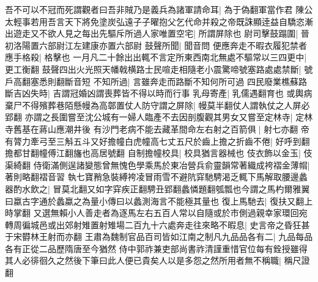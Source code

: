 吾不可以不冠而死謂觀者曰吾非賊乃是義兵為諸軍請命耳|{
	為于偽翻軍當作君}
陳公太輕事若用吾言天下將免塗炭弘遠子子曜抱父乞代命并殺之帝既誅顯逹益自驕恣漸出遊走又不欲人見之每出先驅斥所過人家唯置空宅|{
	所謂屏除也}
尉司擊鼓蹋圍|{
	晉初洛陽置六部尉江左建康亦置六部尉}
鼓聲所聞|{
	聞音問}
便應奔走不暇衣履犯禁者應手格殺|{
	格擊也}
一月凡二十餘出出輒不言定所東西南北無處不驅常以三四更中|{
	更工衡翻}
鼓聲四出火光照天幡戟横路士民喧走相隨老小震驚啼號塞路處處禁斷|{
	號戶高翻塞悉則翻斷音短}
不知所過|{
	言雖奔走而路斷不知何所可過}
四民廢業樵蘇路斷吉凶失時|{
	吉謂冠婚凶謂喪葬皆不得以時而行事}
乳母寄產|{
	乳儒遇翻育也}
或輿病棄尸不得殯葬巷陌懸幔為高鄣置仗人防守謂之屏除|{
	幔莫半翻仗人謂執仗之人屏必郢翻}
亦謂之長圍嘗至沈公城有一婦人臨產不去因剖腹觀其男女又嘗至定林寺|{
	定林寺舊基在蔣山應潮井後}
有沙門老病不能去藏革間命左右射之百箭俱|{
	射七亦翻}
帝有膂力牽弓至三斛五斗又好擔幢白虎幢高七丈五尺於齒上擔之折齒不倦|{
	好呼到翻擔都甘翻幢傅江翻旛也高居號翻}
自制擔幢校具|{
	校具猶言器械也}
伎衣飾以金玉|{
	伎渠綺翻}
侍衛滿側逞諸變態曾無愧色學乘馬於東冶營兵俞靈韻常著織成袴褶金薄㡌|{
	著則略翻褶音習}
執七寶矟急裝縛袴凌冒雨雪不避阬穽馳騁渴乏輒下馬解取腰邊蠡器酌水飲之|{
	冒莫北翻又如字穽疾正翻騁丑郢翻蠡憐題翻瓠瓢也今謂之馬杓爾雅翼曰蠃古字通於蠡蠃之為量小傳曰以蠡測海言不能極其量也}
復上馬馳去|{
	復扶又翻上時掌翻}
又選無賴小人善走者為逐馬左右五百人常以自隨或於市側過親幸家環回宛轉周徧城邑或出郊射雉置射雉場二百九十六處奔走往來略不暇息|{
	史言帝之昏狂甚于宋欎林王射而亦翻}
王肅為魏制官品百司皆如江南之制凡九品品各有二|{
	九品每品各有正從二品歷隋唐至今猶然}
侍中郭祚兼吏部尚書祚清謹重惜官位每有銓授雖得其人必徘徊久之然後下筆曰此人便已貴矣人以是多怨之然所用者無不稱職|{
	稱尺證翻}


